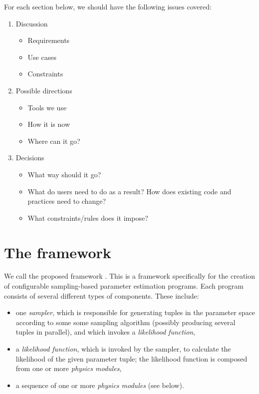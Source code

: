 \documentclass[draftmode,draftwater]{memarticle}
\newcommand{\cosmosis}{\name{CosmoSIS}\xspace}
\begin{document}
\begin{fixme}
  For each section below, we should have the following issues covered:

  \begin{enumerate}
  \item Discussion
    \begin{itemize}
    \item Requirements
    \item Use cases
    \item Constraints
    \end{itemize}
  \item Possible directions
    \begin{itemize}
    \item Tools we use
    \item How it is now
    \item Where can it go?
    \end{itemize}
  \item Decisions
    \begin{itemize}
    \item What way should it go?
    \item What do users need to do as a result? How does existing code and practices need to change?
    \item What constraints/rules does it impose?
    \end{itemize}
  \end{enumerate}
\end{fixme}

\section{The \cosmosis framework}

We call the proposed framework \cosmosis. This is a framework
specifically for the creation of configurable sampling-based
parameter estimation programs. Each program consists of several
different types of components. These include:
\begin{itemize}
\item one \emph{sampler}, which is responsible for generating tuples
  in the parameter space according to some some sampling algorithm
  (possibly producing several tuples in parallel), and which invokes a
  \emph{likelihood function},
\item a \emph{likelihood function}, which is invoked by the sampler,
  to calculate the likelihood of the given parameter tuple; the
  likelihood function is composed from one or more \emph{physics
    modules},
\item a sequence of one or more \emph{physics modules} (see below).
\end{itemize}
\end{document}
